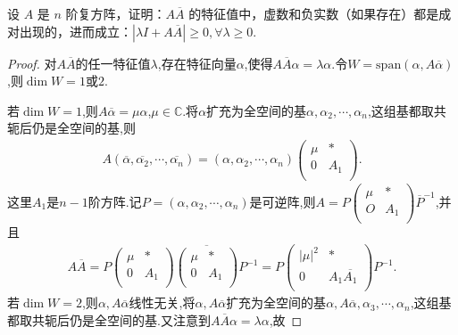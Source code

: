\documentclass[../../main.tex]{subfiles}%
\begin{document}
\begin{example}
设 $A$ 是 $n$ 阶复方阵，证明：$A\overline{A}$ 的特征值中，虚数和负实数（如果存在）都是成对出现的，进而成立：$|\lambda I + A\overline{A}| \geqslant  0, \forall \lambda \geqslant  0$.
\end{example}
\begin{proof}

对$A\overline{A}$的任一特征值$\lambda$,存在特征向量$\alpha$,使得$A\overline{A}\alpha =\lambda \alpha$.令$W=\mathrm{span}\left( \alpha ,A\overline{\alpha } \right)$,则$\dim W=1$或$2$.

若$\dim W=1$,则$A\overline{\alpha }=\mu \alpha$,$\mu \in \mathbb{C}$.将$\alpha$扩充为全空间的基$\alpha ,\alpha _2,\cdots ,\alpha _n$,这组基都取共轭后仍是全空间的基,则
\begin{align*}
A\left( \overline{\alpha },\overline{\alpha _2},\cdots ,\overline{\alpha _n} \right) =\left( \alpha ,\alpha _2,\cdots ,\alpha _n \right) \begin{pmatrix}
\mu&		*\\
0&		A_1\\
\end{pmatrix}.
\end{align*}
这里$A_1$是$n-1$阶方阵.记$P=\left( \alpha ,\alpha _2,\cdots ,\alpha _n \right)$是可逆阵,则$A=P\begin{pmatrix}
\mu&		*\\
O&		A_1\\
\end{pmatrix} \overline{P}^{-1}$,并且
\begin{align*}
A\overline{A}=P\begin{pmatrix}
\mu&		*\\
0&		A_1\\
\end{pmatrix} \overline{\begin{pmatrix}
\mu&		*\\
0&		A_1\\
\end{pmatrix} }P^{-1}=P\begin{pmatrix}
\left| \mu \right|^2&		*\\
0&		A_1\overline{A_1}\\
\end{pmatrix} P^{-1}.
\end{align*}
若$\dim W=2$,则$\alpha ,A\overline{\alpha }$线性无关,将$\alpha ,A\overline{\alpha }$扩充为全空间的基$\alpha ,A\overline{\alpha },\alpha _3,\cdots ,\alpha _n$,这组基都取共轭后仍是全空间的基.又注意到$A\overline{A}\alpha =\lambda \alpha$,故

\end{proof}
\end{document}
